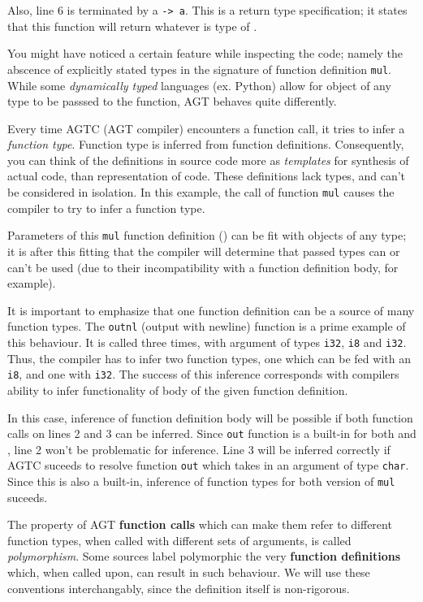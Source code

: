\documentclass[times, utf8, diplomski]{fer}
\theoremstyle{definition}
\begin{document}
Also, line 6 is terminated by a \texttt{-> a}. This is a return type specification;
it states that this function will return whatever is type of . 

You might have noticed a certain feature while inspecting the code; 
namely the abscence of explicitly stated types in the signature of function definition \texttt{mul}.
While some \textit{dynamically typed} languages (ex. Python) allow for object of any type to be passsed
to the function, AGT behaves quite differently. 

Every time AGTC (AGT compiler) encounters a function call,
it tries to infer a \textit{function type}. Function type is inferred from function definitions. 
Consequently, you can think of the definitions in source code more as \textit{templates} for synthesis
of actual code, than representation of code. 
These definitions lack types, and can't be considered in isolation.
In this example, the call of function \texttt{mul} causes the compiler to try to infer a function type.

Parameters of this \texttt{mul} function definition () can be fit with objects of
any type; it is after this fitting that the compiler will determine that passed types can or can't
be used (due to their incompatibility with a function definition body, for example).

It is important to emphasize that one function definition can be a source of many function types.
The \texttt{outnl} (output with newline) function is a prime example of this behaviour.
It is called three times, with argument of types \texttt{i32}, \texttt{i8} and \texttt{i32}.
Thus, the compiler has to infer two function types, 
one which can be fed with an \texttt{i8}, and one with \texttt{i32}.
The success of this inference corresponds with compilers ability to infer functionality of 
body of the given function definition.

In this case, inference of function definition body will be possible if both function calls on lines
2 and 3 can be inferred. Since \texttt{out} function is a built-in for both  and ,
line 2 won't be problematic for inference. Line 3 will be inferred correctly if AGTC suceeds to resolve
function \texttt{out} which takes in an argument of type \texttt{char}. Since this is also a built-in,
inference of function types for both version of \texttt{mul} suceeds.

The property of AGT \textbf{function calls} which can make them refer to different function types, 
when called with different sets of arguments, is called \textit{polymorphism}.
Some sources label polymorphic the very \textbf{function definitions} which, when called upon, 
can result in such behaviour.
We will use these conventions interchangably, since the definition itself is non-rigorous.
\end{document}
